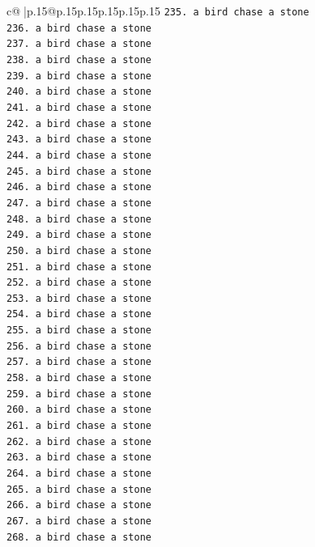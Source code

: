 \documentclass{article}
\begin{document}
{\begin{supertabular}{c@{$\;$}|p{.15\linewidth}@{}p{.15\linewidth}p{.15\linewidth}p{.15\linewidth}p{.15\linewidth}p{.15\linewidth}}
{{{\texttt{235. a bird chase a stone} \\
\texttt{236. a bird chase a stone} \\
\texttt{237. a bird chase a stone} \\
\texttt{238. a bird chase a stone} \\
\texttt{239. a bird chase a stone} \\
\texttt{240. a bird chase a stone} \\
\texttt{241. a bird chase a stone} \\
\texttt{242. a bird chase a stone} \\
\texttt{243. a bird chase a stone} \\
\texttt{244. a bird chase a stone} \\
\texttt{245. a bird chase a stone} \\
\texttt{246. a bird chase a stone} \\
\texttt{247. a bird chase a stone} \\
\texttt{248. a bird chase a stone} \\
\texttt{249. a bird chase a stone} \\
\texttt{250. a bird chase a stone} \\
\texttt{251. a bird chase a stone} \\
\texttt{252. a bird chase a stone} \\
\texttt{253. a bird chase a stone} \\
\texttt{254. a bird chase a stone} \\
\texttt{255. a bird chase a stone} \\
\texttt{256. a bird chase a stone} \\
\texttt{257. a bird chase a stone} \\
\texttt{258. a bird chase a stone} \\
\texttt{259. a bird chase a stone} \\
\texttt{260. a bird chase a stone} \\
\texttt{261. a bird chase a stone} \\
\texttt{262. a bird chase a stone} \\
\texttt{263. a bird chase a stone} \\
\texttt{264. a bird chase a stone} \\
\texttt{265. a bird chase a stone} \\
\texttt{266. a bird chase a stone} \\
\texttt{267. a bird chase a stone} \\
\texttt{268. a bird chase a stone} \\
}}}
\end{supertabular}}
\end{document}
